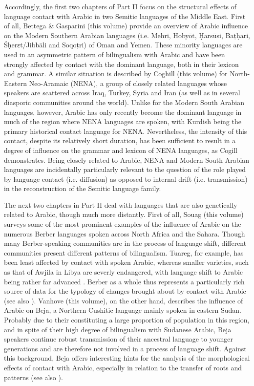 \documentclass[output=paper]{langsci/langscibook}
\begin{document}
Accordingly, the first two chapters of Part II focus on the structural effects of language contact with Arabic in two Semitic languages of the Middle East. First of all, Bettega \& Gasparini (this volume) provide an overview of Arabic influence on the Modern Southern Arabian languages (i.e. Mehri, Hobyōt, Ḥarsūsi, Baṭḥari, Śḥerɛt/Jibbāli and Soqoṭri) of Oman and Yemen. These minority languages are used in an asymmetric pattern of bilingualism with Arabic and have been strongly affected by contact with the dominant language, both in their lexicon and grammar. A similar situation is described by Coghill (this volume) for North-Eastern Neo-Aramaic (NENA), a group of closely related languages whose speakers are scattered across Iraq, Turkey, Syria and Iran (as well as in several diasporic communities around the world). Unlike for the Modern South Arabian languages, however, Arabic has only recently become the dominant language in much of the region where NENA languages are spoken, with Kurdish being the primary historical contact language for NENA. Nevertheless, the intensity of this contact, despite its relatively short duration, has been sufficient to result in a degree of influence on the grammar and lexicon of NENA languages, as Cogill demonstrates. Being closely related to Arabic, NENA and Modern South Arabian languages are incidentally particularly relevant to the question of the role played by language contact (i.e. diffusion) as opposed to internal drift (i.e. transmission) in the reconstruction of the Semitic language family.

The next two chapters in Part II deal with languages that are also genetically related to Arabic, though much more distantly. First of all, Souag (this volume) surveys some of the most prominent examples of the influence of Arabic on the numerous Berber languages spoken across North Africa and the Sahara. Though many Berber-speaking communities are in the process of language shift, different communities present different patterns of bilingualism. Tuareg, for example, has been least affected by contact with spoken Arabic, whereas smaller varieties, such as that of Awjila in Libya are severly endangered, with language shift to Arabic being rather far advanced \citep{vanPuttenSouag2015}. Berber as a whole thus represents a particularly rich source of data for the typology of changes brought about by contact with Arabic (see also \citealt{Kossmann2013book}). Vanhove (this volume), on the other hand, describes the influence of Arabic on Beja, a Northern Cushitic language mainly spoken in eastern Sudan. Probably due to their constituting a large proportion of population in this region, and in spite of their high degree of bilingualism with Sudanese Arabic, Beja speakers continue robust transmission of their ancestral language to younger generations and are therefore not involved in a process of language shift. Against this background, Beja offers interesting hints for the analysis of the morphological effects of contact with Arabic, especially in relation to the transfer of roots and patterns (see also \citealt{Vanhove2012}). 
\end{document}
